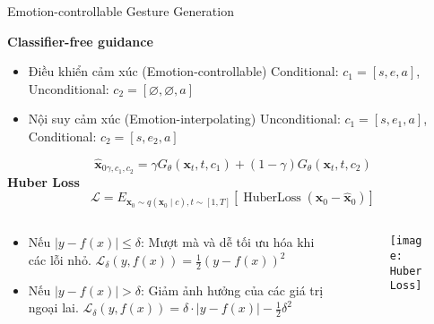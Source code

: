 
\begin{frame}{Emotion-controllable Gesture Generation}
	
	\textbf{Classifier-free guidance}
	
	\begin{itemize}
		\item Điều khiển cảm xúc (Emotion-controllable)
		Conditional: $c_1 = [ s, e, a ]$,  Unconditional: $c_2 = [ \varnothing, \varnothing, a ]$
		
		\item Nội suy cảm xúc (Emotion-interpolating)
		Unconditional: $c_1 = [ s, e_1, a ]$, Conditional: $c_2 = [ s, e_2, a ]$
	\end{itemize}
	\begin{equation} \label{eq:denoise}
		\hat{\mathbf{x}}_{0 \gamma, c_{1}, c_{2}}=\gamma G_{\theta} \left(\mathbf{x}_{t}, t, c_{1}\right)+(1-\gamma) G_{\theta} \left(\mathbf{x}_{t}, t, c_{2}\right)
	\end{equation}
	\vspace{-5pt}
	\textbf{Huber Loss}
	\begin{equation} \label{eq:huberloss}
		\mathcal{L}=E_{\mathbf{x}_{0} \sim q\left(\mathbf{x}_{0} \mid c\right), t \sim[1, T]}\left[\operatorname{HuberLoss}\left(\mathbf{x}_{0}-\hat{\mathbf{x}}_{0}\right)\right]
	\end{equation}
	\vspace{-5pt}
	\begin{columns}
		\begin{column}{0.5\textwidth}
			\begin{itemize}
				\item Nếu $ |y - f(x)| \leq \delta$:
				Mượt mà và dễ tối ưu hóa khi các lỗi nhỏ.
					$\mathcal{L}_{\delta}(y, f(x)) = \frac{1}{2} (y - f(x))^2$
				\item Nếu $ |y - f(x)| > \delta$: 
				Giảm ảnh hưởng của các giá trị ngoại lai.
					$\mathcal{L}_{\delta}(y, f(x)) =  \delta \cdot |y - f(x)| - \frac{1}{2} \delta^2$
			\end{itemize}
		\end{column}
		\begin{column}{0.5\textwidth}
			\begin{figure}
				\centering
				\texttt{[image: HuberLoss]}
			\end{figure}
		\end{column}
	\end{columns}
	
\end{frame}



